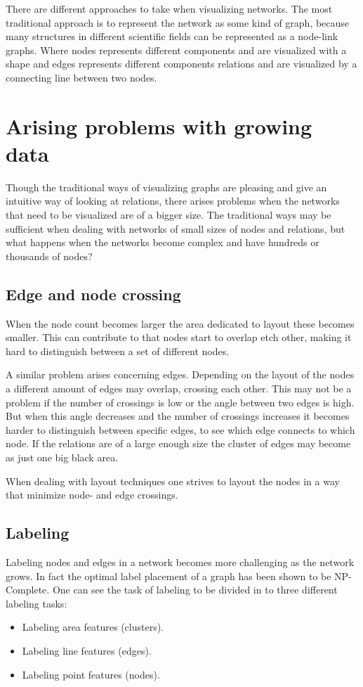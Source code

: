 \documentclass[a4paper,11pt]{kth-mag}
\begin{document}
There are different approaches to take when visualizing networks. The most traditional approach is to represent the network as some kind of graph, because many structures in different scientific fields can be represented
as a node-link graphs. Where nodes represents different components and are visualized with a shape and edges represents different components relations and are visualized by a connecting line between two nodes.

\section{Arising problems with growing data}
Though the traditional ways of visualizing graphs are pleasing and give an intuitive way of looking at relations, there arises problems when the networks that need to be visualized are of a bigger size. The traditional
ways may be sufficient when dealing with networks of small sizes of nodes and relations, but what happens when the networks become complex and have hundreds or thousands of nodes?
\subsection{Edge and node crossing}
When the node count becomes larger the area dedicated to layout these becomes smaller. This can contribute to that nodes start to overlap etch other, making it hard to distinguish between a set of different nodes.

A similar problem arises concerning edges. Depending on the layout of the nodes a different amount of edges may overlap, crossing each other. This may not be a problem if the number of crossings is low or the angle between 
two edges is high. But when this angle decreases and the number of crossings increases it becomes harder to distinguish between specific edges, to see which edge connects to which node. If the relations are of a large enough size the cluster of edges
may become as just one big black area.

When dealing with layout techniques one strives to layout the nodes in a way that minimize node- and edge crossings.
\subsection{Labeling}
Labeling nodes and edges in a network becomes more challenging as the network grows. In fact the optimal label placement of a graph has been shown to be NP-Complete\cite{Marks91thecomputational}.
One can see the task of labeling to be divided in to three different labeling tasks:
\begin{itemize}
	\item{Labeling area features (clusters).}
	\item{Labeling line features (edges).}
	\item{Labeling point features (nodes).}
\end{itemize}
\end{document}
